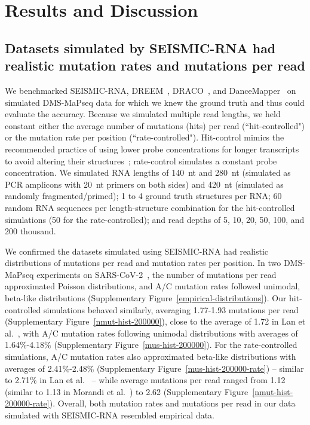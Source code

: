 \documentclass[unnumsec,webpdf,contemporary,large]{oup-authoring-template}%
\theoremstyle{thmstyleone}%
\theoremstyle{thmstyletwo}%
\theoremstyle{thmstylethree}%
\begin{document}
\section{Results and Discussion}
\label{results-section}

\subsection{Datasets simulated by SEISMIC-RNA had realistic mutation rates and mutations per read}
\label{simulated-distributions}

We benchmarked SEISMIC-RNA, DREEM~\cite{Tomezsko2020}, DRACO~\cite{Morandi2021}, and DanceMapper~\cite{Olson2022} on simulated DMS-MaPseq data for which we knew the ground truth and thus could evaluate the accuracy.
Because we simulated multiple read lengths, we held constant either the average number of mutations (hits) per read (``hit-controlled") or the mutation rate per position (``rate-controlled").
Hit-control mimics the recommended practice of using lower probe concentrations for longer transcripts~\cite{Seetin2014} to avoid altering their structures~\cite{Saleem2025}; rate-control simulates a constant probe concentration.
We simulated RNA lengths of 140~nt and 280~nt (simulated as PCR amplicons with 20~nt primers on both sides) and 420~nt (simulated as randomly fragmented/primed); 1 to 4 ground truth structures per RNA; 60 random RNA sequences per length-structure combination for the hit-controlled simulations (50 for the rate-controlled); and read depths of 5, 10, 20, 50, 100, and 200 thousand.

We confirmed the datasets simulated using SEISMIC-RNA had realistic distributions of mutations per read and mutation rates per position.
In two DMS-MaPseq experiments on SARS-CoV-2~\cite{Morandi2021,Lan2022}, the number of mutations per read approximated Poisson distributions, and A/C mutation rates followed unimodal, beta-like distributions (Supplementary Figure~\ref{empirical-distributions}).
Our hit-controlled simulations behaved similarly, averaging 1.77-1.93 mutations per read (Supplementary Figure~\ref{nmut-hist-200000}), close to the average of 1.72 in Lan et al.~\cite{Lan2022}, with A/C mutation rates following unimodal distributions with averages of 1.64\%-4.18\% (Supplementary Figure~\ref{mus-hist-200000}).
For the rate-controlled simulations, A/C mutation rates also approximated beta-like distributions with averages of 2.41\%-2.48\% (Supplementary Figure~\ref{mus-hist-200000-rate}) -- similar to 2.71\% in Lan et al.~\cite{Lan2022} -- while average mutations per read ranged from 1.12 (similar to 1.13 in Morandi et al.~\cite{Morandi2021}) to 2.62 (Supplementary Figure~\ref{nmut-hist-200000-rate}).
Overall, both mutation rates and mutations per read in our data simulated with SEISMIC-RNA resembled empirical data.
\end{document}
